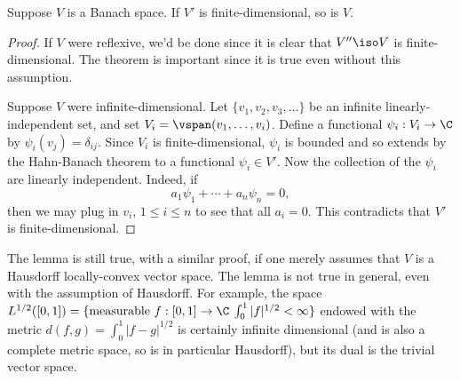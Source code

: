 \documentclass[12pt]{article}
\begin{document}
\begin{lem}\label{dual}Suppose $V$ is a Banach space. If $V'$ is finite-dimensional, so is $V$.\end{lem}
\begin{proof}If $V$ were reflexive, we'd be done since it is clear that $V'' \iso V$ is finite-dimensional. The theorem is important since it is true even without this assumption.

Suppose $V$ were infinite-dimensional. Let $\{v_1,v_2,v_3,\ldots\}$ be an infinite linearly-independent set, and set $V_i = \vspan(v_1,\ldots,v_i)$. Define a functional $\psi_i:V_i \to \C$ by $\psi_i(v_j) = \delta_{ij}$. Since $V_i$ is finite-dimensional, $\psi_i$ is bounded and so extends by the Hahn-Banach theorem to a functional $\psi_i \in V'$. Now the collection of the $\psi_i$ are linearly independent. Indeed, if 
\[a_1\psi_1+\cdots + a_n\psi_n = 0,\] then we may plug in $v_i$, $1 \leq i \leq n$ to see that all $a_i = 0$. This contradicts that $V'$ is finite-dimensional.\end{proof}
\begin{rk}The lemma is still true, with a similar proof, if one merely assumes that $V$ is a Hausdorff locally-convex vector space. The lemma is not true in general, even with the assumption of Hausdorff. For example, the space $L^{1/2}([0,1]) = \{\text{measurable }f:[0,1] \to \C\: \int_0^1 |f|^{1/2} < \infty\}$ endowed with the metric $d(f,g) = \int_0^1 |f-g|^{1/2}$ is certainly infinite dimensional (and is also a complete metric space, so is in particular Hausdorff), but its dual is the trivial vector space.\end{rk}
\end{document}
